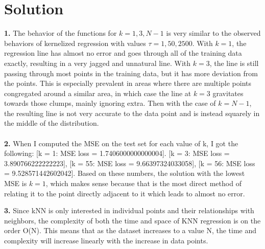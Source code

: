 \documentclass[submit]{harvardml}
\newenvironment{solution}
  {\color{blue}\section*{Solution}}
{}
\begin{document}
\newpage
\begin{solution}
	\textbf{1. } The behavior of the functions for $k = 1, 3, N - 1$ is very similar 
  to the observed behaviors of kernelized regression with values $\tau = 1, 50, 2500$. 
  With $k = 1$, the regression line has almost no error and goes through all of the training data exactly, 
  resulting in a very jagged and unnatural line. With $k=3$, the line is still 
  passing through most points in the training data, but it has more deviation from the points. 
  This is especially prevalent in areas where there are multiple points congregated around a similar area, 
  in which case the line at $k = 3$ gravitates towards those clumps, mainly ignoring extra. Then with the case
  of $k = N - 1$, the resulting line is not very accurate to the data point and is instead
  squarely in the middle of the distribution. \\\\

  \textbf{2. } When I computed the MSE on the test set for each value of k, I got the following: 
  [k = 1: MSE loss = 1.7406000000000004].
  [k = 3: MSE loss = 3.890766222222223],
  [k = 55: MSE loss = 9.66397324033058],
  [k = 56: MSE loss = 9.528571442602042]. Based on these numbers, the solution with the lowest MSE is $k = 1$, 
  which makes sense because that is the most direct method of relating it to the point directly adjacent to it which leads
  to almost no error. 

  \textbf{3. } Since kNN is only interested in individual points and their relationships with neighbors, the 
  complexity of both the time and space of KNN regression is on the order O(N). This means that as the dataset increases to a value N, 
  the time and complexity will increase linearly with the increase in data points. 
\end{solution}
\newpage


\end{document}
